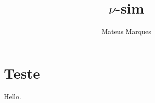 \documentclass[a4paper,fleqn,12pt]{article}
\title{\huge{$\nu$-sim}}
\author{Mateus Marques}
\begin{document}
\maketitle

\section{Teste}

Hello.
\end{document}
